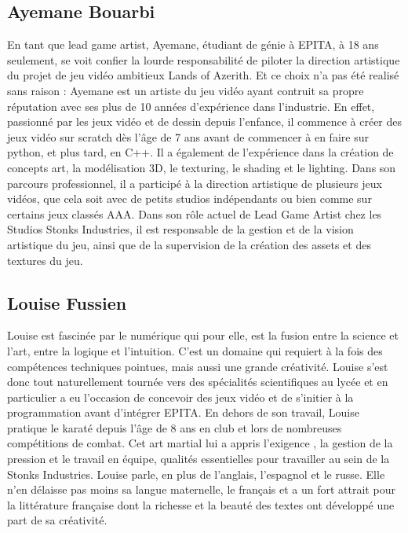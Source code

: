  \subsection*{Ayemane Bouarbi} 
En tant que lead game artist, Ayemane, étudiant de génie à EPITA, à 18 ans seulement,
se voit confier la lourde responsabilité de piloter la direction artistique du projet de jeu vidéo
ambitieux Lands of Azerith. Et ce choix n'a pas été realisé sans raison : Ayemane est un artiste
du jeu vidéo ayant contruit sa propre réputation avec ses plus de 10 années d'expérience dans
l'industrie. En effet, passionné par les jeux vidéo et de dessin depuis l'enfance, il commence à
créer des jeux vidéo sur scratch dès l'âge de 7 ans avant de commencer à en faire sur python,
et plus tard, en C++. Il a également de l'expérience dans la création de concepts art, la
modélisation 3D, le texturing, le shading et le lighting. Dans son parcours professionnel, il a
participé à la direction artistique de plusieurs jeux vidéos, que cela soit avec de petits studios
indépendants ou bien comme sur certains jeux classés AAA. Dans son rôle actuel de Lead
Game Artist chez les Studios Stonks Industries, il est responsable de la gestion et de la vision
artistique du jeu, ainsi que de la supervision de la création des assets et des textures du jeu.
\\

\subsection*{Louise Fussien} 
Louise est fascinée par le numérique qui pour elle, est la fusion entre la science et l'art, entre la logique et l'intuition. 
C'est un domaine qui requiert à la fois des compétences techniques pointues, mais aussi une grande créativité.
 Louise s'est donc tout naturellement tournée vers des spécialités scientifiques au lycée et en particulier a eu l'occasion de concevoir des jeux vidéo et 
 de s'initier à la programmation avant d'intégrer EPITA. 
 En dehors de son travail, Louise pratique le karaté depuis l'âge de 8 ans en club et lors de nombreuses compétitions de combat. 
 Cet art martial lui a appris l'exigence , la gestion de la pression et le travail en équipe, qualités essentielles pour travailler au sein de la Stonks Industries. 
Louise parle, en plus de l'anglais, l'espagnol et le russe. Elle n'en délaisse pas moins sa langue maternelle, 
le français et a un fort attrait pour la littérature française dont la richesse et la beauté des textes ont développé une part de sa créativité.

